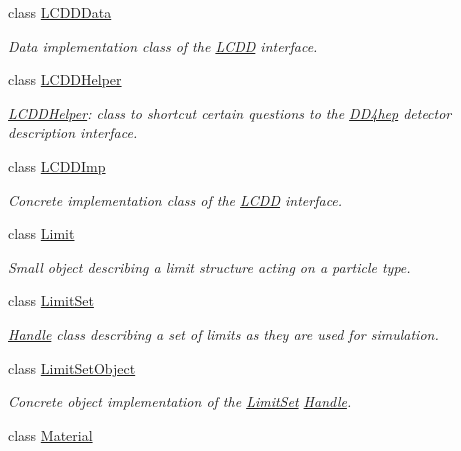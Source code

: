 \begin{DoxyCompactItemize}
class \hyperlink{class_d_d4hep_1_1_geometry_1_1_l_c_d_d_data}{L\+C\+D\+D\+Data}
\begin{DoxyCompactList}\small\item\em Data implementation class of the \hyperlink{class_d_d4hep_1_1_geometry_1_1_l_c_d_d}{L\+C\+DD} interface. \end{DoxyCompactList}\item 
class \hyperlink{class_d_d4hep_1_1_geometry_1_1_l_c_d_d_helper}{L\+C\+D\+D\+Helper}
\begin{DoxyCompactList}\small\item\em \hyperlink{class_d_d4hep_1_1_geometry_1_1_l_c_d_d_helper}{L\+C\+D\+D\+Helper}\+: class to shortcut certain questions to the \hyperlink{namespace_d_d4hep}{D\+D4hep} detector description interface. \end{DoxyCompactList}\item 
class \hyperlink{class_d_d4hep_1_1_geometry_1_1_l_c_d_d_imp}{L\+C\+D\+D\+Imp}
\begin{DoxyCompactList}\small\item\em Concrete implementation class of the \hyperlink{class_d_d4hep_1_1_geometry_1_1_l_c_d_d}{L\+C\+DD} interface. \end{DoxyCompactList}\item 
class \hyperlink{class_d_d4hep_1_1_geometry_1_1_limit}{Limit}
\begin{DoxyCompactList}\small\item\em Small object describing a limit structure acting on a particle type. \end{DoxyCompactList}\item 
class \hyperlink{class_d_d4hep_1_1_geometry_1_1_limit_set}{Limit\+Set}
\begin{DoxyCompactList}\small\item\em \hyperlink{class_d_d4hep_1_1_handle}{Handle} class describing a set of limits as they are used for simulation. \end{DoxyCompactList}\item 
class \hyperlink{class_d_d4hep_1_1_geometry_1_1_limit_set_object}{Limit\+Set\+Object}
\begin{DoxyCompactList}\small\item\em Concrete object implementation of the \hyperlink{class_d_d4hep_1_1_geometry_1_1_limit_set}{Limit\+Set} \hyperlink{class_d_d4hep_1_1_handle}{Handle}. \end{DoxyCompactList}\item 
class \hyperlink{class_d_d4hep_1_1_geometry_1_1_material}{Material}

\end{DoxyCompactItemize}
